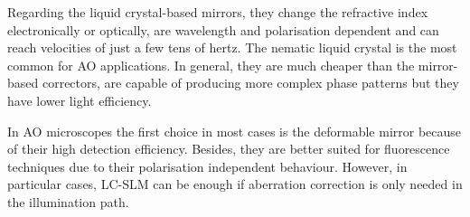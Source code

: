 Regarding the liquid crystal-based mirrors, they change the refractive index electronically or optically, are wavelength and polarisation dependent and can reach velocities of just a few tens of hertz. The nematic liquid crystal is the most common for AO applications. In general, they are much cheaper than the mirror-based correctors, are capable of producing more complex phase patterns but they have lower light efficiency.   

In AO microscopes the first choice in most cases is the deformable mirror because of their high detection efficiency. Besides, they are better suited for fluorescence techniques due to their polarisation independent behaviour. However, in particular cases, LC-SLM can be enough if aberration correction is only needed in the illumination path.

